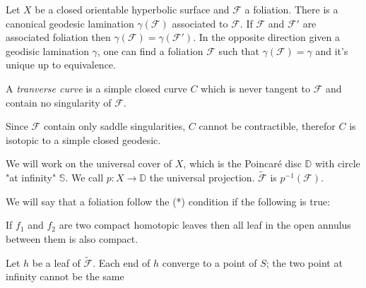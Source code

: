 \begin{thm}
Let $X$ be a closed orientable hyperbolic surface and $\mathcal{F}$ a foliation. There is a canonical geodesic lamination $\gamma(\mathcal{F})$ associated to $\mathcal{F}$. If $\mathcal{F}$ and $\mathcal{F}'$ are associated foliation then $\gamma(\mathcal{F})= \gamma(\mathcal{F}')$. In the opposite direction given a geodisic lamination $\gamma$, one can find a foliation $\mathcal{F}$ such that $\gamma(\mathcal{F})=\gamma$ and it's unique up to equivalence.
\end{thm}
\begin{dfnt}
A \emph{tranverse curve} is a simple closed curve $C$ which is never tangent to $\mathcal{F}$ and contain no singularity of $\mathcal{F}$.
\end{dfnt}

\begin{rmq}
Since $\mathcal{F}$ contain only saddle singularities, $C$ cannot be contractible, therefor $C$ is isotopic to a simple closed geodesic.
\end{rmq}

We will work on the universal cover of $X$, which is the Poincaré disc $\mathbb{D}$ with circle "at infinity" $\mathbb{S}$. We call $p:X \to \mathbb{D}$ the universal projection.
$\mathcal{\tilde{F}}$ is $p^{-1}(\mathcal{F})$.

We will say that a foliation follow the (*) condition if the following is true:
\begin{center}
If $f_1$ and $f_2$ are two compact homotopic leaves then all leaf in the open annulus between them  is also compact.
\end{center}

\begin{lem}
Let $h$ be a leaf of $\mathcal{\tilde{F}}$. Each end of $h$ converge to a point of $S$; the two point at infinity cannot be the same
\end{lem}

